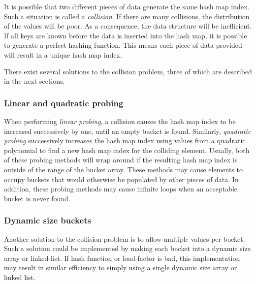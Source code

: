 \documentclass{article}
\begin{document}
It is possible that two different pieces of data generate the same hash map index.
Such a situation is called a {\em collision}. If there are many collisions, the distribution of the values
will be poor. As a consequence, the data structure will be inefficient.
If all keys are known before the data is inserted into the hash map, it is possible to generate a perfect
hashing function. This means each piece of data provided will result in a unique hash map index.

There exist several solutions to the collision problem, three of which are described in the next sections.

\subsubsection{Linear and quadratic probing}
When performing {\em linear probing}, a collision causes the hash map index to be increased successively by one,
until an empty bucket is found. Similarly, {\em quadratic probing} successively increases the hash map index using
values from a quadratic polynomial to find a new hash map index for the colliding element.
Usually, both of these probing methods will wrap around if the resulting hash map index is outside of the range
of the bucket array. These methods may cause elements to occupy buckets that would otherwise be populated by
other pieces of data. In addition, these probing methods may cause infinite loops when an acceptable bucket is
never found.

\subsubsection{Dynamic size buckets}
Another solution to the collision problem is to allow multiple values per bucket. Such a solution could be
implemented by making each bucket into a dynamic size array or linked-list. If hash function or load-factor is bad,
this implementation may result in similar efficiency to simply using a single dynamic size array or linked list.


\end{document}
